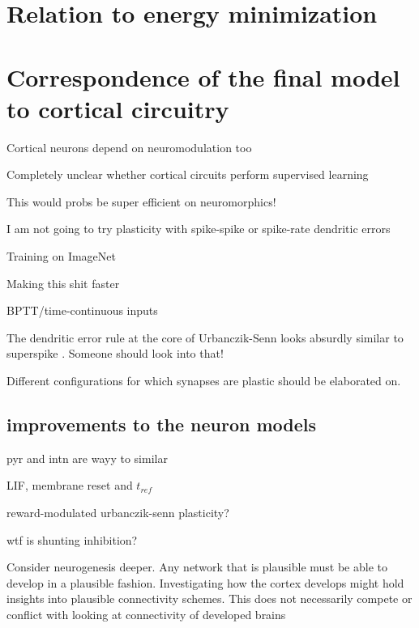 
\section{Relation to energy minimization}


\section{Correspondence of the final model to cortical circuitry}

Cortical neurons depend on neuromodulation too \cite{Roelfsema2018}

Completely unclear whether cortical circuits perform supervised learning \citep{magee2020synaptic}


This would probs be super efficient on neuromorphics!

I am not going to try plasticity with spike-spike or spike-rate dendritic errors

Training on ImageNet

Making this shit faster

BPTT/time-continuous inputs


The dendritic error rule at the core of Urbanczik-Senn looks absurdly similar to superspike \citep{Zenke2018}.
Someone should look into that!

Different configurations for which synapses are plastic should be elaborated on.


\subsection{improvements to the neuron models}



pyr and intn are wayy to similar

LIF, membrane reset and $t_{ref}$

reward-modulated urbanczik-senn plasticity?

wtf is shunting inhibition?

Consider neurogenesis deeper. Any network that is plausible must be able to develop in a plausible fashion. Investigating
how the cortex develops might hold insights into plausible connectivity schemes. This does not necessarily compete or
conflict with looking at connectivity of developed brains


